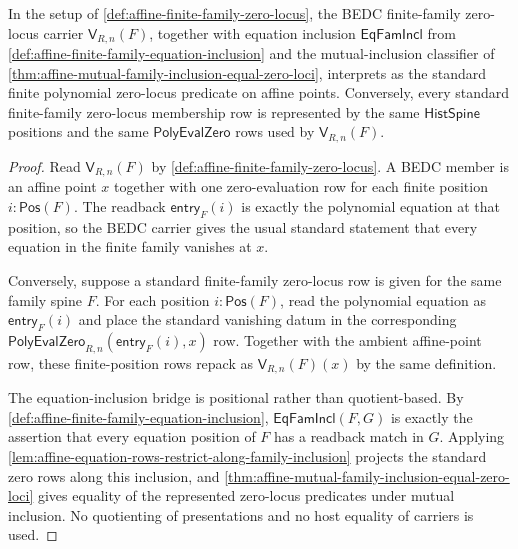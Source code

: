 \begin{theorem}
\label{thm:affinevar-finite-family-standard-zero-locus-bridge}
In the setup of \autoref{def:affine-finite-family-zero-locus}, the BEDC finite-family zero-locus carrier $\mathsf{V}_{R,n}(F)$, together with equation inclusion $\mathsf{EqFamIncl}$ from \autoref{def:affine-finite-family-equation-inclusion} and the mutual-inclusion classifier of \autoref{thm:affine-mutual-family-inclusion-equal-zero-loci}, interprets as the standard finite polynomial zero-locus predicate on affine points. Conversely, every standard finite-family zero-locus membership row is represented by the same $\mathsf{HistSpine}$ positions and the same $\mathsf{PolyEvalZero}$ rows used by $\mathsf{V}_{R,n}(F)$.
\end{theorem}
\begin{proof}
Read $\mathsf{V}_{R,n}(F)$ by \autoref{def:affine-finite-family-zero-locus}. A BEDC member is an affine point $x$ together with one zero-evaluation row for each finite position $i:\mathsf{Pos}(F)$. The readback $\mathsf{entry}_{F}(i)$ is exactly the polynomial equation at that position, so the BEDC carrier gives the usual standard statement that every equation in the finite family vanishes at $x$.

Conversely, suppose a standard finite-family zero-locus row is given for the same family spine $F$. For each position $i:\mathsf{Pos}(F)$, read the polynomial equation as $\mathsf{entry}_{F}(i)$ and place the standard vanishing datum in the corresponding $\mathsf{PolyEvalZero}_{R,n}(\mathsf{entry}_{F}(i),x)$ row. Together with the ambient affine-point row, these finite-position rows repack as $\mathsf{V}_{R,n}(F)(x)$ by the same definition.

The equation-inclusion bridge is positional rather than quotient-based. By \autoref{def:affine-finite-family-equation-inclusion}, $\mathsf{EqFamIncl}(F,G)$ is exactly the assertion that every equation position of $F$ has a readback match in $G$. Applying \autoref{lem:affine-equation-rows-restrict-along-family-inclusion} projects the standard zero rows along this inclusion, and \autoref{thm:affine-mutual-family-inclusion-equal-zero-loci} gives equality of the represented zero-locus predicates under mutual inclusion. No quotienting of presentations and no host equality of carriers is used.
\end{proof}

